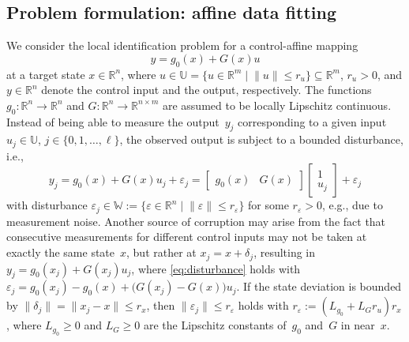 \documentclass[a4paper, reqno]{amsart}
\newcommand{\R}{\ensuremath{\mathbb R}}
\newcommand{\dd}{\ell}
\begin{document}
    \subsection{Problem formulation: affine data fitting}
    \label{sec:problem-formulation}
We consider the local identification problem for a control-affine mapping
\begin{equation}\nonumber
    y = g_0(x) + G(x) u
\end{equation}
at a target state $x \in \mathbb{R}^n$, where 
$u \in \mathbb{U} = \{ u \in \mathbb{R}^m \mid \lVert u \rVert \leq r_u \} \subseteq \mathbb R^m$, $r_u>0$, and $y \in \mathbb{R}^{n}$ denote the control input and the output, respectively. 
The functions $g_0: \mathbb R^n\rightarrow \mathbb R^n$ and $G:\mathbb R^n\rightarrow \R^{n\times m}$ are assumed to be locally Lipschitz continuous. 
Instead of being able to measure the output~$y_j$ corresponding to a given input $u_j\in\mathbb U$, $j \in \{0,1,\ldots,\dd\}$, the observed output is subject to a bounded disturbance, i.e.,
\begin{equation}\label{eq:disturbance}
    y_j = g_0(x) + G(x)u_j + \varepsilon_j = \begin{bmatrix}
        g_0(x) & G(x)
    \end{bmatrix} \begin{bmatrix}
        1 \\ u_j
    \end{bmatrix} + \varepsilon_j
\end{equation}
with disturbance $\varepsilon_j \in \mathbb{W} := \{ \varepsilon\in \mathbb{R}^{n} \mid \lVert \varepsilon \rVert \leq r_\varepsilon \}$ for some $r_\varepsilon > 0$, e.g., due to measurement noise. 
Another source of corruption may arise from the fact that consecutive measurements for different control inputs may not be taken at exactly the same state~$x$, but rather at $x_j = x+\delta_j$, resulting in 
    $y_j = g_0(x_j) + G(x_j)u_j$,
where \eqref{eq:disturbance} holds with $\varepsilon_j = g_0(x_j) - g_0(x) + \bigl(G(x_j) - G(x)\bigr) u_j$. 
If the state deviation is bounded by $\lVert \delta_j \rVert = \lVert x_j - x \rVert \leq r_x$, then $\lVert \varepsilon_j\rVert \leq r_\varepsilon$ holds with $r_\varepsilon := (L_{g_0} + L_{G}r_u)r_x$, where $L_{g_0} \geq 0$ and $L_G \geq 0$ are the Lipschitz constants of~$g_0$ and~$G$ in near~$x$.
\end{document}
